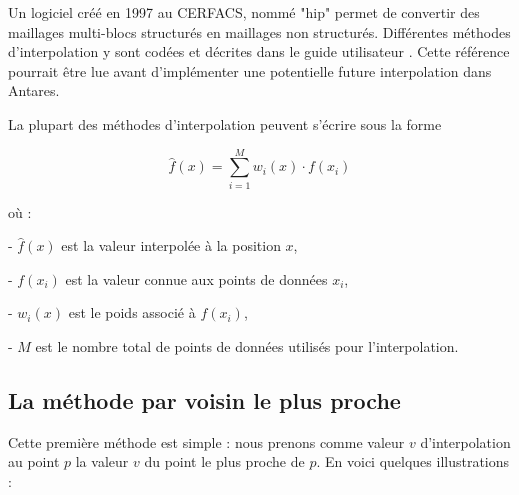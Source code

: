 Un logiciel créé en 1997 au CERFACS, nommé "hip" permet de convertir des maillages multi-blocs structurés en maillages non structurés.
Différentes méthodes d'interpolation y sont codées et décrites dans le guide utilisateur \cite{muller2020}. Cette référence pourrait être lue avant d'implémenter une potentielle future interpolation dans Antares.

La plupart des méthodes d'interpolation peuvent s'écrire sous la forme

\begin{equation}
    \hat{f}(x) = \sum_{i=1}^{M} w_i(x) \cdot f(x_i)
\end{equation}


où :

- \(\hat{f}(x)\) est la valeur interpolée à la position \(x\),

- \(f(x_i)\) est la valeur connue aux points de données \(x_i\),

- \(w_i(x)\) est le poids associé à \(f(x_i)\),

- \(M\) est le nombre total de points de données utilisés pour l'interpolation.




\subsection{La méthode par voisin le plus proche}
Cette première méthode est simple : nous prenons comme valeur \( v \) d'interpolation au point \( p \) la valeur \( v \) du point le plus proche de \( p \).
En voici quelques illustrations :


